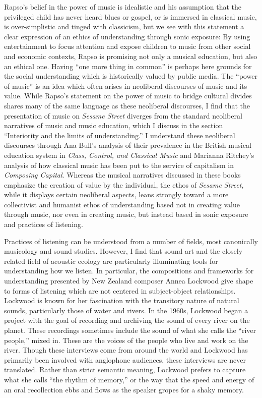 \documentclass[12pt,letterpaper]{article}
\begin{document}
	Rapso's belief in the power of music is idealistic and his assumption
	that the privileged child has never heard blues or gospel, or is 
	immersed in classical music, is over-simplistic and tinged with 
	classicism, but we see with this 
	statement a clear expression of
	an ethics of understanding through sonic exposure: 
	By using entertainment to focus attention and expose children to music 
	from other social and economic contexts,
	Rapso is promising not only a musical education, but also an ethical 
	one. Having ``one more thing in common'' is perhaps here grounds for 
	the social understanding which is historically valued by public media.  
	The ``power of music'' is an idea which often arises in neoliberal 
	discourses of music and its value. While Rapso's statement on the power
	of music to bridge cultural divides shares many of the same language
	as these neoliberal  discourses, I find that the presentation of music
	on \textit{Sesame Street} diverges from the standard neoliberal
	narratives of music and music education, which I discuss in the section
	``Interiority and the limits of understanding.'' I understand these 
	neoliberal discourses through
	Ana Bull's analysis of their prevalence in the British musical
	education system in \textit{Class, Control, and Classical Music} and
	Marianna Ritchey's analysis of how classical music has been put to the
	service of capitalism in \textit{Composing Capital}. Whereas the musical
	narratives discussed in these books emphasize the creation of 
	value by the individual, the ethos of \textit{Sesame Street}, while it
	displays certain
	neoliberal aspects, leans strongly toward a more collectivist and 
	humanist ethos of understanding based not in creating value through
	music, nor even in creating music, but instead 
	based in sonic exposure and practices of listening.  

	Practices of listening can be understood from a number of fields,
	most canonically musicology and sound studies. However, I find that 
	sound art and the closely related field of acoustic ecology are 
	particularly illuminating tools for understanding how we listen. 
	In particular, the compositions and frameworks for 
	understanding presented by New Zealand composer Annea Lockwood give 
	shape to forms of listening which are not centered in subject-object 
	relationships.	Lockwood is known for her 
	fascination with the transitory nature of natural sounds, particularly 
	those of water and rivers. In the 1960s, Lockwood began a project with
	the goal of recording and archiving the sound of every river on the 
	planet.\autocite[117]{Rodgers} These recordings sometimes include the 
	sound of what she calls the ``river people,'' mixed in. These are the 	
	voices of the people who live and work on the 
	river.\autocite[121]{Rodgers} Though these interviews come from around 	
	the world and Lockwood has primarily been involved with anglophone 
	audiences, these interviews are never translated. Rather than strict 
	semantic meaning, Lockwood prefers to capture what she calls ``the 
	rhythm of memory,'' or the way that the speed and energy of an oral 
	recollection ebbs and flows as the speaker gropes for a shaky 
	memory.\autocite[122]{Rodgers}  
\end{document}
